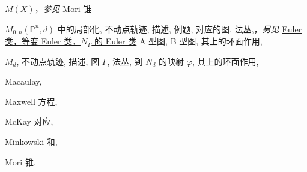 \begin{theindex}
\indexspace
\item \leavevmode\hypertarget{idx:0746}{$M(X)$}，\textit{参见} \hyperlink{idx:0911}{Mori 锥}
\indexspace
\item \leavevmode\hypertarget{idx:0725}{$\overline M_{0,n}(\mathbb P^n,d)$ 中的局部化},\enspace{}
\subitem \leavevmode\hypertarget{idx:0726}{不动点轨迹},\enspace{}
\subsubitem \leavevmode\hypertarget{idx:0727}{描述},\enspace{}
\subsubitem \leavevmode\hypertarget{idx:0728}{例题},\enspace{}
\subsubitem \leavevmode\hypertarget{idx:0729}{对应的图},\enspace{}
\subsubitem \leavevmode\hypertarget{idx:0730}{法丛},\enspace{}，\textit{另见} \hyperlink{idx:0259}{Euler 类，等变 Euler 类，$N_\Gamma$ 的 Euler 类}
\subsubitem \leavevmode\hypertarget{idx:0731}{A 型图},\enspace{}
\subsubitem \leavevmode\hypertarget{idx:0732}{B 型图},\enspace{}
\subitem \leavevmode\hypertarget{idx:0733}{其上的环面作用},\enspace{}
\indexspace
\item \leavevmode\hypertarget{idx:0777}{$M_d$},\enspace{}
\subitem \leavevmode\hypertarget{idx:0778}{不动点轨迹},\enspace{}
\subsubitem \leavevmode\hypertarget{idx:0779}{描述},\enspace{}
\subsubitem \leavevmode\hypertarget{idx:0780}{图 $\Gamma$},\enspace{}
\subsubitem \leavevmode\hypertarget{idx:0781}{法丛},\enspace{}
\subitem \leavevmode\hypertarget{idx:0782}{到 $N_d$ 的映射 $\varphi$},\enspace{}
\subitem \leavevmode\hypertarget{idx:0783}{其上的环面作用},\enspace{}
\indexspace
\item \leavevmode\hypertarget{idx:0747}{Macaulay},\enspace{}
\indexspace
\item \leavevmode\hypertarget{idx:0775}{Maxwell 方程},\enspace{}
\indexspace
\item \leavevmode\hypertarget{idx:0776}{McKay 对应},\enspace{}
\indexspace
\item \leavevmode\hypertarget{idx:0785}{Minkowski 和},\enspace{}
\indexspace
\item \leavevmode\hypertarget{source:486}{}\hypertarget{idx:0911}{Mori 锥},\enspace{}

\end{theindex}
